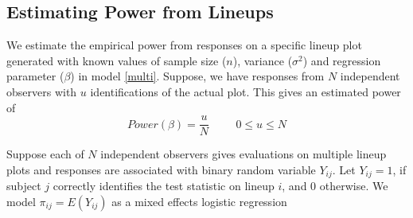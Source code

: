 \documentclass{article}
\begin{document}




%


\subsection{Estimating Power from Lineups}

We estimate the empirical power from responses on a specific lineup plot  generated with known values of sample size ($n$), variance ($\sigma^2$) and regression parameter ($\beta$) in model \ref{multi}. Suppose, we have responses from $N$ independent observers with $u$ identifications of the actual plot. This gives an estimated power of
\begin{equation}\label{power_est} Power(\beta)=\frac{u}{N} \hspace{1cm} 0 \le u \le N \end{equation}

Suppose each of $N$ independent observers gives evaluations on multiple lineup plots and responses are associated with binary random variable $Y_{ij}$. Let $Y_{ij} = 1$, if subject $j$ correctly identifies the test statistic on lineup $i$, and 0 otherwise.
We model $\pi_{ij} = E(Y_{ij})$ as  a mixed effects logistic regression
\end{document}
